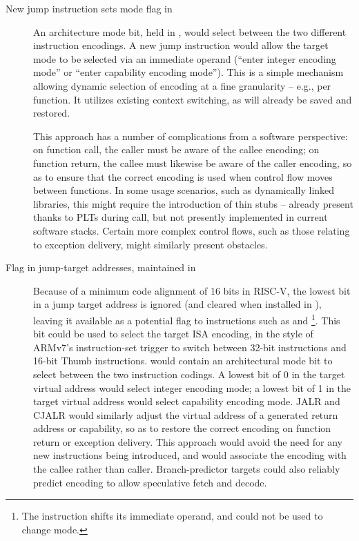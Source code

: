 \begin{description}
\item[New jump instruction sets mode flag in \xccsr{}]
  An architecture mode bit, held in \xccsr{}, would select between the two
  different instruction encodings.
  A new jump instruction would allow the target mode to be selected via an
  immediate operand (``enter integer encoding mode'' or ``enter capability
  encoding mode'').
  This is a simple mechanism allowing dynamic selection of encoding at a fine
  granularity -- e.g., per function.  It utilizes existing context
  switching, as \xccsr{} will already be saved and restored.

  This approach has a number of complications from a software perspective:
  on function call, the caller must be aware of the callee encoding; on
  function return, the callee must likewise be aware of the caller encoding,
  so as to ensure that the correct encoding is used when control flow moves
  between functions.
  In some usage scenarios, such as dynamically linked libraries, this might
  require the introduction of thin stubs -- already present thanks to PLTs
  during call, but not presently implemented in current software stacks.
  Certain more complex control flows, such as those relating to exception
  delivery, might similarly present obstacles.

\item[Flag in jump-target addresses, maintained in \xccsr{}]
  Because of a minimum code alignment of 16 bits in RISC-V, the lowest bit in
  a jump target address is ignored (and cleared when installed in \PC{}),
  leaving it available as a potential flag to instructions such as
   and \footnote{The  instruction shifts its immediate
  operand, and could not be used to change mode.}.
  This bit could be used to select the target ISA encoding, in the style of
  ARMv7's instruction-set trigger to switch between 32-bit instructions and
  16-bit Thumb instructions.
  \xccsr{} would contain an architectural mode bit to select between the two
  instruction codings.
  A lowest bit of 0 in the target virtual address would select integer
  encoding mode; a
  lowest bit of 1 in the target virtual address would select capability
  encoding mode.
  JALR and CJALR would similarly adjust the virtual address of a generated
  return address or capability, so as to restore the correct encoding on
  function return or exception delivery.
  This approach would avoid the need for any new instructions being
  introduced, and would associate the encoding with the callee rather than
  caller.
  Branch-predictor targets could also reliably predict encoding to allow
  speculative fetch and decode.


\end{description}
